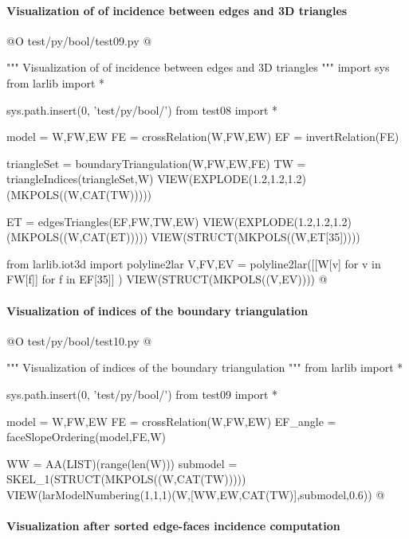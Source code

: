 \documentclass[11pt,oneside]{article}    %
\begin{document}
\paragraph{Visualization of of incidence between edges and 3D triangles}

@O test/py/bool/test09.py @{
""" Visualization of of incidence between edges and 3D triangles """
import sys
from larlib import *

sys.path.insert(0, 'test/py/bool/')
from test08 import *

model = W,FW,EW
FE = crossRelation(W,FW,EW)
EF = invertRelation(FE)

triangleSet = boundaryTriangulation(W,FW,EW,FE)
TW = triangleIndices(triangleSet,W)
VIEW(EXPLODE(1.2,1.2,1.2)(MKPOLS((W,CAT(TW)))))

ET = edgesTriangles(EF,FW,TW,EW)
VIEW(EXPLODE(1.2,1.2,1.2)(MKPOLS((W,CAT(ET)))))
VIEW(STRUCT(MKPOLS((W,ET[35]))))

from larlib.iot3d import polyline2lar
V,FV,EV = polyline2lar([[W[v] for v in FW[f]] for f in EF[35]] )
VIEW(STRUCT(MKPOLS((V,EV))))
@}



\paragraph{Visualization of indices of the boundary triangulation}

@O test/py/bool/test10.py @{
""" Visualization of indices of the boundary triangulation """
from larlib import *

sys.path.insert(0, 'test/py/bool/')
from test09 import *

model = W,FW,EW
FE = crossRelation(W,FW,EW)
EF_angle = faceSlopeOrdering(model,FE,W)

WW = AA(LIST)(range(len(W)))
submodel = SKEL_1(STRUCT(MKPOLS((W,CAT(TW)))))
VIEW(larModelNumbering(1,1,1)(W,[WW,EW,CAT(TW)],submodel,0.6))
@}


\paragraph{Visualization after sorted edge-faces incidence computation}
\end{document}
